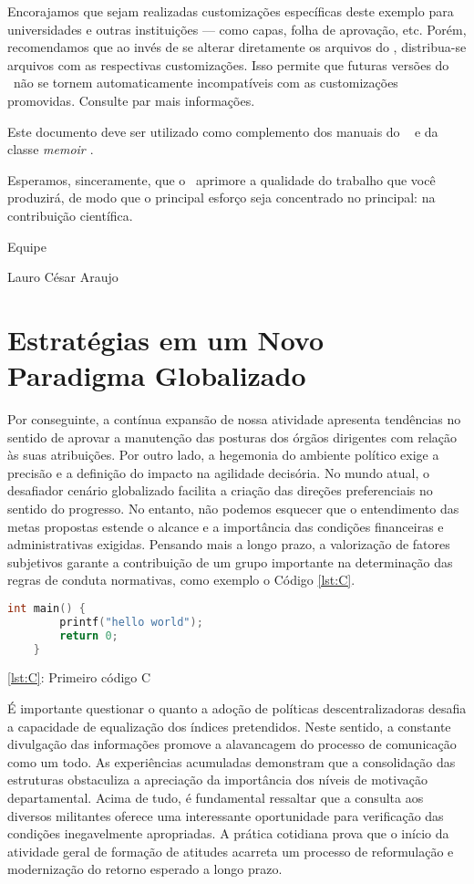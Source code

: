 Encorajamos que sejam realizadas customizações específicas deste exemplo para
universidades e outras instituições --- como capas, folha de aprovação, etc.
Porém, recomendamos que ao invés de se alterar diretamente os arquivos do
\abnTeX, distribua-se arquivos com as respectivas customizações.
Isso permite que futuras versões do \abnTeX~não se tornem automaticamente
incompatíveis com as customizações promovidas. Consulte
 par mais informações.

Este documento deve ser utilizado como complemento dos manuais do \abnTeX\ \cite{abntex2classe,abntex2cite,abntex2cite-alf} e da classe \emph{memoir \cite{memoir}}. 

Esperamos, sinceramente, que o \abnTeX\ aprimore a qualidade do trabalho que
você produzirá, de modo que o principal esforço seja concentrado no principal:
na contribuição científica.

Equipe \abnTeX 

Lauro César Araujo

\section{Estratégias em um Novo Paradigma Globalizado}
Por conseguinte, a contínua expansão de nossa atividade apresenta tendências no sentido de aprovar a manutenção das posturas dos órgãos dirigentes com relação às suas atribuições. Por outro lado, a hegemonia do ambiente político exige a precisão e a definição do impacto na agilidade decisória. No mundo atual, o desafiador cenário globalizado facilita a criação das direções preferenciais no sentido do progresso. No entanto, não podemos esquecer que o entendimento das metas propostas estende o alcance e a importância das condições financeiras e administrativas exigidas. Pensando mais a longo prazo, a valorização de fatores subjetivos garante a contribuição de um grupo importante na determinação das regras de conduta normativas, como exemplo o Código \ref{lst:C}.

\begin{lstlisting}[language=C, label=lst:C]
    int main() {
        printf("hello world");
        return 0;
    }
\end{lstlisting}
\lstlistingname{ \ref{lst:C}: Primeiro c\'{o}digo C}

É importante questionar o quanto a adoção de políticas descentralizadoras desafia a capacidade de equalização dos índices pretendidos. Neste sentido, a constante divulgação das informações promove a alavancagem do processo de comunicação como um todo. As experiências acumuladas demonstram que a consolidação das estruturas obstaculiza a apreciação da importância dos níveis de motivação departamental. Acima de tudo, é fundamental ressaltar que a consulta aos diversos militantes oferece uma interessante oportunidade para verificação das condições inegavelmente apropriadas. A prática cotidiana prova que o início da atividade geral de formação de atitudes acarreta um processo de reformulação e modernização do retorno esperado a longo prazo. 

